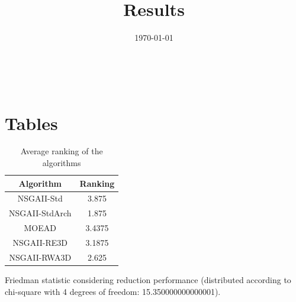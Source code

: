 \documentclass{article}
\title{Results}
\author{}
\date{\today}
\begin{document}
\oddsidemargin 0in \topmargin 0in\maketitle
\
\section{Tables}
\begin{table}[!htp]
\centering
\caption{Average ranking of the algorithms}
\begin{tabular}{c|c}
Algorithm&Ranking\\
\hline
NSGAII-Std&3.875\\
NSGAII-StdArch&1.875\\
MOEAD&3.4375\\
NSGAII-RE3D&3.1875\\
NSGAII-RWA3D&2.625\\
\end{tabular}
\end{table}


Friedman statistic considering reduction performance (distributed according to chi-square with 4 degrees of freedom: 15.350000000000001).
\end{document}
